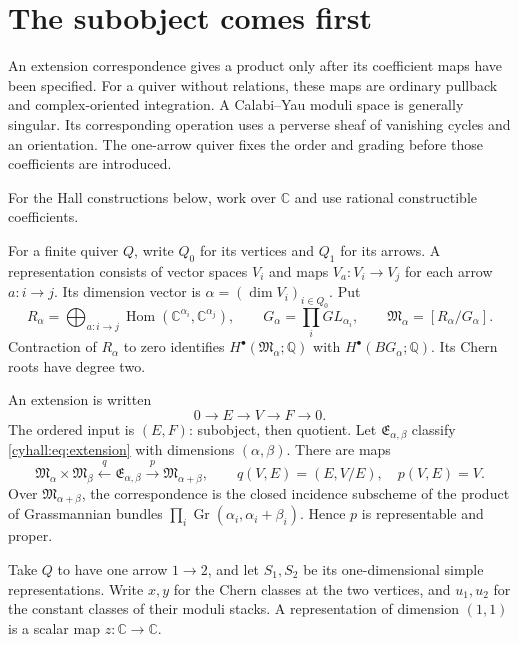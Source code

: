\section{The subobject comes first}
\label{cyhall:sec:arrow}

An extension correspondence gives a product only after its
coefficient maps have been specified. For a quiver without relations,
these maps are ordinary pullback and complex-oriented integration.
A Calabi--Yau moduli space is generally singular. Its corresponding
operation uses a perverse sheaf of vanishing cycles and an orientation.
The one-arrow quiver fixes the order and grading before those
coefficients are introduced.

For the Hall constructions below, work over $\mathbb C$ and use
rational constructible coefficients.

For a finite quiver $Q$, write $Q_0$ for its vertices and $Q_1$
for its arrows. A representation consists of vector spaces $V_i$
and maps $V_a:V_i\to V_j$ for each arrow $a:i\to j$.
Its dimension vector is $\alpha=(\dim V_i)_{i\in Q_0}$.
Put
\[
 R_\alpha=\bigoplus_{a:i\to j}\operatorname{Hom}
             (\mathbb C^{\alpha_i},\mathbb C^{\alpha_j}),
 \qquad G_\alpha=\prod_iGL_{\alpha_i},\qquad
 \mathfrak M_\alpha=[R_\alpha/G_\alpha].
\]
Contraction of $R_\alpha$ to zero identifies
$H^\bullet(\mathfrak M_\alpha;\mathbb Q)$ with
$H^\bullet(BG_\alpha;\mathbb Q)$.
Its Chern roots have degree two.

An extension is written
\begin{equation}\label{cyhall:eq:extension}
 0\longrightarrow E\longrightarrow V\longrightarrow F
 \longrightarrow0.
\end{equation}
The ordered input is $(E,F)$: subobject, then quotient.
Let $\mathfrak E_{\alpha,\beta}$ classify
\eqref{cyhall:eq:extension} with dimensions $(\alpha,\beta)$.
There are maps
\begin{equation}\label{cyhall:eq:correspondence}
 \mathfrak M_\alpha\times\mathfrak M_\beta
 \xleftarrow{\ q\ }\mathfrak E_{\alpha,\beta}
 \xrightarrow{\ p\ }\mathfrak M_{\alpha+\beta},
 \qquad q(V,E)=(E,V/E),\quad p(V,E)=V.
\end{equation}
Over $\mathfrak M_{\alpha+\beta}$, the correspondence is the closed
incidence subscheme of the product of Grassmannian bundles
$\prod_i\operatorname{Gr}(\alpha_i,\alpha_i+\beta_i)$.
Hence $p$ is representable and proper.

Take $Q$ to have one arrow $1\to2$, and let $S_1,S_2$ be its
one-dimensional simple representations. Write $x,y$ for the Chern
classes at the two vertices, and $u_1,u_2$ for the constant classes
of their moduli stacks.
A representation of dimension $(1,1)$ is a scalar map $z:\mathbb C\to
\mathbb C$.

